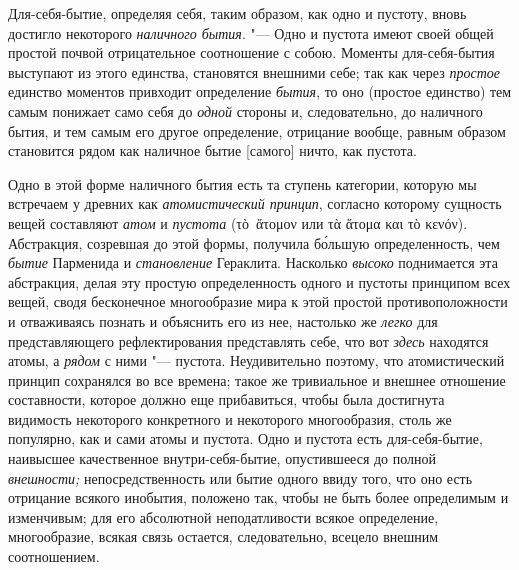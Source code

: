 Для-себя-бытие, определяя себя, таким образом, как одно и пустоту, вновь
достигло некоторого {\em наличного бытия}. "--- Одно и
пустота имеют своей общей простой почвой отрицательное соотношение с собою.
Моменты для-себя-бытия выступают из этого единства, становятся внешними
себе; так как через {\em простое} единство моментов
привходит определение {\em бытия}, то оно (простое
единство) тем самым понижает само себя до {\em одной}
стороны и, следовательно, до наличного бытия, и тем самым его другое
определение, отрицание вообще, равным образом становится рядом как наличное
бытие [самого] ничто, как пустота.


Одно в этой форме наличного бытия есть та ступень категории, которую мы
встречаем у древних как {\em атомистический принцип},
согласно которому сущность вещей составляют {\em атом} и {\em пустота}
(\textgreek{τὸ~ἅτομον} или \textgreek{τὰ ἅτομα και τὸ κενόν}).
Абстракция, созревшая до этой формы, получила б\'{о}льшую определенность, чем
{\em бытие} Парменида и {\em становление} Гераклита. Насколько
{\em высоко} поднимается эта абстракция, делая эту
простую определенность одного и пустоты принципом всех вещей, сводя
бесконечное многообразие мира к этой простой противоположности и
отваживаясь познать и объяснить его из нее, настолько же
{\em легко} для представляющего рефлектирования
представлять себе, что вот {\em здесь} находятся атомы,
а {\em рядом} с ними "--- пустота. Неудивительно поэтому,
что атомистический принцип сохранялся во все времена; такое же тривиальное
и внешнее отношение составности, которое должно еще прибавиться, чтобы была
достигнута видимость некоторого конкретного и некоторого многообразия,
столь же популярно, как и сами атомы и пустота. Одно и пустота есть
для-себя-бытие, наивысшее качественное внутри-себя-бытие, опустившееся до
полной {\em внешности;} непосредственность или бытие
одного ввиду того, что оно есть отрицание всякого инобытия, положено так,
чтобы не быть более определимым и изменчивым; для его абсолютной
неподатливости всякое определение, многообразие, всякая связь остается,
следовательно, всецело внешним соотношением.

